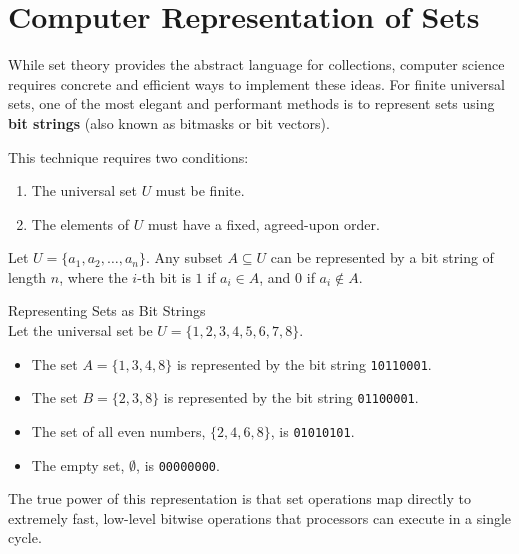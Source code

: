 \section{Computer Representation of Sets}
While set theory provides the abstract language for collections, computer science requires concrete and efficient ways to implement these ideas. For finite universal sets, one of the most elegant and performant methods is to represent sets using \textbf{bit strings} (also known as bitmasks or bit vectors).

This technique requires two conditions:
\begin{enumerate}
    \item The universal set $U$ must be finite.
    \item The elements of $U$ must have a fixed, agreed-upon order.
\end{enumerate}

Let $U = \{a_1, a_2, \dots, a_n\}$. Any subset $A \subseteq U$ can be represented by a bit string of length $n$, where the $i$-th bit is $1$ if $a_i \in A$, and $0$ if $a_i \notin A$.

\begin{example}{Representing Sets as Bit Strings}\\
    Let the universal set be $U = \{1, 2, 3, 4, 5, 6, 7, 8\}$.
    \begin{itemize}
        \item The set $A = \{1, 3, 4, 8\}$ is represented by the bit string \texttt{10110001}.
        \item The set $B = \{2, 3, 8\}$ is represented by the bit string \texttt{01100001}.
        \item The set of all even numbers, $\{2, 4, 6, 8\}$, is \texttt{01010101}.
        \item The empty set, $\emptyset$, is \texttt{00000000}.
    \end{itemize}
\end{example}

The true power of this representation is that set operations map directly to extremely fast, low-level bitwise operations that processors can execute in a single cycle.

